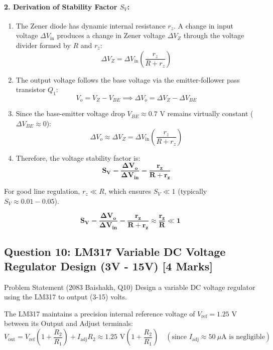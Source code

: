 \documentclass[11pt,a4paper,oneside]{book}
\begin{document}
\paragraph{2. Derivation of Stability Factor $S_V$:}
\begin{enumerate}[leftmargin=1.5em]
  \item The Zener diode has dynamic internal resistance $r_z$. A change in input voltage $\Delta V_{\text{in}}$ produces a change in Zener voltage $\Delta V_Z$ through the voltage divider formed by $R$ and $r_z$:
  \[
  \Delta V_Z = \Delta V_{\text{in}} \left(\frac{r_z}{R + r_z}\right)
  \]
  \item The output voltage follows the base voltage via the emitter-follower pass transistor $Q_1$:
  \[
  V_o = V_Z - V_{BE} \implies \Delta V_o = \Delta V_Z - \Delta V_{BE}
  \]
  \item Since the base-emitter voltage drop $V_{BE} \approx 0.7\text{ V}$ remains virtually constant ($\Delta V_{BE} \approx 0$):
  \[
  \Delta V_o \approx \Delta V_Z = \Delta V_{\text{in}} \left(\frac{r_z}{R + r_z}\right)
  \]
  \item Therefore, the voltage stability factor is:
  \[
  \mathbf{S_V = \frac{\Delta V_o}{\Delta V_{\text{in}}} = \frac{r_z}{R + r_z}}
  \]
\end{enumerate}
For good line regulation, $r_z \ll R$, which ensures $S_V \ll 1$ (typically $S_V \approx 0.01 - 0.05$).

\begin{answerbox}
$$\mathbf{S_V = \frac{\Delta V_o}{\Delta V_{\text{in}}} = \frac{r_z}{R + r_z} \approx \frac{r_z}{R} \ll 1}$$
\end{answerbox}

\vspace{0.6cm}

\subsection{Question 10: LM317 Variable DC Voltage Regulator Design (3V - 15V) [4 Marks]}
\begin{questionbox}{Problem Statement (2083 Baishakh, Q10)}
Design a variable DC voltage regulator using the LM317 to output (3-15) volts.
\end{questionbox}

The LM317 maintains a precision internal reference voltage of $V_{\text{ref}} = 1.25\text{ V}$ between its Output and Adjust terminals:
\[
V_{\text{out}} = V_{\text{ref}} \left(1 + \frac{R_2}{R_1}\right) + I_{\text{adj}} R_2 \approx 1.25\text{ V} \left(1 + \frac{R_2}{R_1}\right) \quad (\text{since } I_{\text{adj}} \approx 50\ \mu\text{A} \text{ is negligible})
\]
\end{document}
